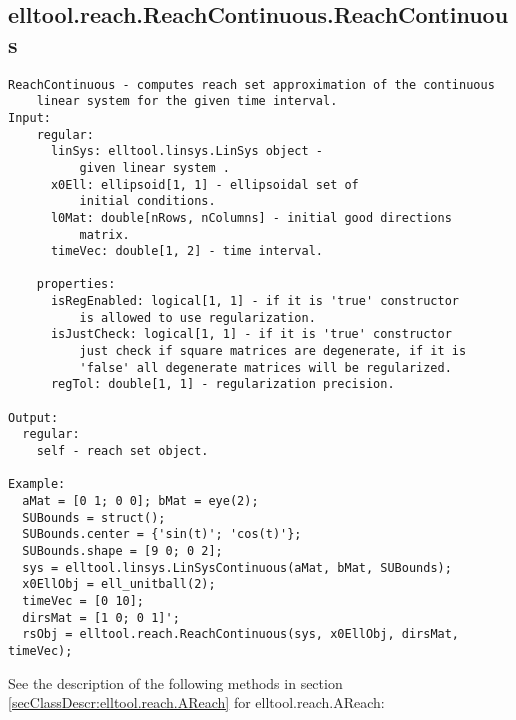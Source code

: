 \subsection{\texorpdfstring{elltool.reach.ReachContinuous.ReachContinuous}{ReachContinuous}}\label{method:elltool.reach.ReachContinuous.ReachContinuous}
\begin{verbatim}
ReachContinuous - computes reach set approximation of the continuous
    linear system for the given time interval.
Input:
    regular:
      linSys: elltool.linsys.LinSys object -
          given linear system .
      x0Ell: ellipsoid[1, 1] - ellipsoidal set of
          initial conditions.
      l0Mat: double[nRows, nColumns] - initial good directions
          matrix.
      timeVec: double[1, 2] - time interval.

    properties:
      isRegEnabled: logical[1, 1] - if it is 'true' constructor
          is allowed to use regularization.
      isJustCheck: logical[1, 1] - if it is 'true' constructor
          just check if square matrices are degenerate, if it is
          'false' all degenerate matrices will be regularized.
      regTol: double[1, 1] - regularization precision.

Output:
  regular:
    self - reach set object.

Example:
  aMat = [0 1; 0 0]; bMat = eye(2);
  SUBounds = struct();
  SUBounds.center = {'sin(t)'; 'cos(t)'};
  SUBounds.shape = [9 0; 0 2];
  sys = elltool.linsys.LinSysContinuous(aMat, bMat, SUBounds);
  x0EllObj = ell_unitball(2);
  timeVec = [0 10];
  dirsMat = [1 0; 0 1]';
  rsObj = elltool.reach.ReachContinuous(sys, x0EllObj, dirsMat, timeVec);
\end{verbatim}


See the description of the following methods in section \ref{secClassDescr:elltool.reach.AReach}
 for elltool.reach.AReach:

